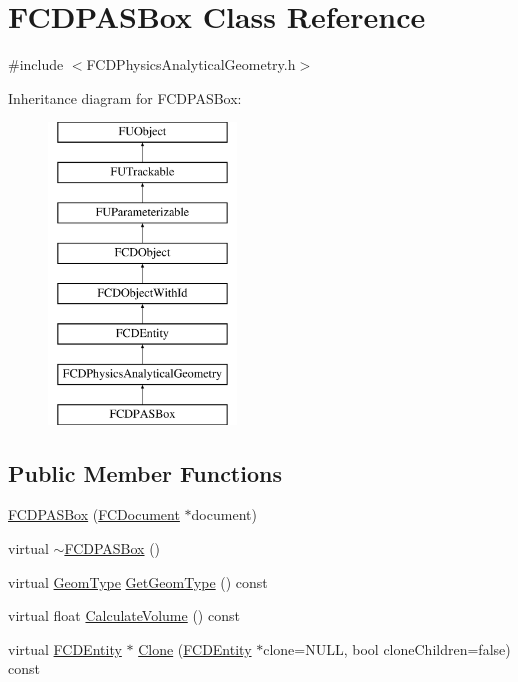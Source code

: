 \hypertarget{classFCDPASBox}{
\section{FCDPASBox Class Reference}
\label{classFCDPASBox}
}


{\ttfamily \#include $<$FCDPhysicsAnalyticalGeometry.h$>$}

Inheritance diagram for FCDPASBox:\begin{figure}[H]
\begin{center}
\leavevmode
\includegraphics[height=8.000000cm]{classFCDPASBox}
\end{center}
\end{figure}
\subsection*{Public Member Functions}
\begin{DoxyCompactItemize}
\item 
\hyperlink{classFCDPASBox_a7bfc08418717115ab302677f5f87821f}{FCDPASBox} (\hyperlink{classFCDocument}{FCDocument} $\ast$document)
\item 
virtual \hyperlink{classFCDPASBox_aae464f9822d5e7fe44df2874a11f2143}{$\sim$FCDPASBox} ()
\item 
virtual \hyperlink{classFCDPhysicsAnalyticalGeometry_a511583406e5c6a1bb5bd84c0453a452c}{GeomType} \hyperlink{classFCDPASBox_a4b2cdf28c8dffcc0b4a839f75900baeb}{GetGeomType} () const 
\item 
virtual float \hyperlink{classFCDPASBox_a2b4be02d7f8b4dd8d9dd591d4657b5a4}{CalculateVolume} () const 
\item 
virtual \hyperlink{classFCDEntity}{FCDEntity} $\ast$ \hyperlink{classFCDPASBox_a75222259173d8dd1e54e49f08f9ea262}{Clone} (\hyperlink{classFCDEntity}{FCDEntity} $\ast$clone=NULL, bool cloneChildren=false) const 
\end{DoxyCompactItemize}
